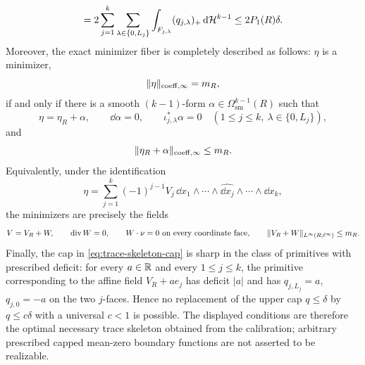 \begin{theorem}
\begin{equation}
=2
\sum_{j=1}^k\sum_{\lambda\in\{0,L_j\}}
\int_{F_{j,\lambda}}(q_{j,\lambda})_+\,\mathrm{d}\mathcal{H}^{k-1}
\le 2P_1(R)\delta .
\end{equation}
Moreover, the exact minimizer fiber is completely described as follows:
$\eta$ is a minimizer,
\[
\lVert \eta \rVert_{\mathrm{coeff},\infty}=m_R,
\]
if and only if there is a smooth $(k-1)$-form
$\alpha\in\Omega^{k-1}_{\mathrm{sm}}(R)$ such that
\[
\eta=\eta_R+\alpha,
\qquad
\dd\alpha=0,
\qquad
\iota_{j,\lambda}^\ast\alpha=0
\quad(1\le j\le k,\ \lambda\in\{0,L_j\}),
\]
and
\[
\lVert \eta_R+\alpha \rVert_{\mathrm{coeff},\infty}\le m_R .
\]
Equivalently, under the identification
\[
\eta=\sum_{j=1}^k(-1)^{j-1}V_j\,
\dd x_1\wedge\cdots\wedge\widehat{\dd x_j}\wedge\cdots\wedge\dd x_k,
\]
the minimizers are precisely the fields
\[
V=V_R+W,
\qquad
\operatorname{div} W=0,
\qquad
W\cdot\nu=0\ \text{on every coordinate face},
\qquad
\lVert V_R+W \rVert_{L^\infty(R;\ell^\infty)}\le m_R .
\]
Finally, the cap in \eqref{eq:trace-skeleton-cap} is sharp in the class of
primitives with prescribed deficit: for every $a\in\mathbb{R}$ and every
$1\le j\le k$, the primitive corresponding to the affine field $V_R+a e_j$
has deficit $|a|$ and has $q_{j,L_j}=a$, $q_{j,0}=-a$ on the two $j$-faces.
Hence no replacement of the upper cap $q\le\delta$ by $q\le c\delta$ with a
universal $c<1$ is possible. The displayed conditions are therefore the
optimal necessary trace skeleton obtained from the calibration; arbitrary
prescribed capped mean-zero boundary functions are not asserted to be
realizable.
\end{theorem}

